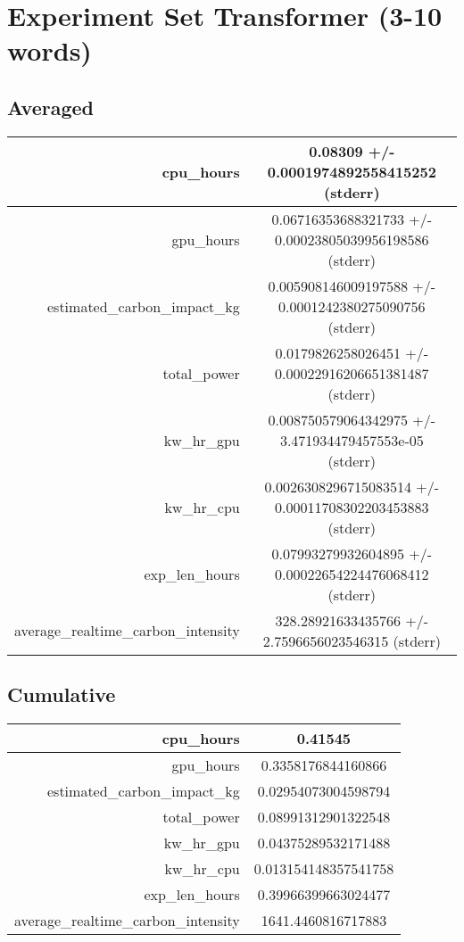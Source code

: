 \documentclass{article}%
\begin{document}
%
\normalsize%
\section{Experiment Set Transformer (3{-}10 words)}%
\label{sec:Experiment Set Transformer (3{-}10 words)}%
\subsection{Averaged}%
\label{subsec:Averaged}%
\begin{tabular}{|r|c|}%
\hline%
cpu\_hours&0.08309 +/{-} 0.0001974892558415252 (stderr)\\%
\hline%
gpu\_hours&0.06716353688321733 +/{-} 0.00023805039956198586 (stderr)\\%
\hline%
estimated\_carbon\_impact\_kg&0.005908146009197588 +/{-} 0.0001242380275090756 (stderr)\\%
\hline%
total\_power&0.0179826258026451 +/{-} 0.00022916206651381487 (stderr)\\%
\hline%
kw\_hr\_gpu&0.008750579064342975 +/{-} 3.471934479457553e{-}05 (stderr)\\%
\hline%
kw\_hr\_cpu&0.0026308296715083514 +/{-} 0.00011708302203453883 (stderr)\\%
\hline%
exp\_len\_hours&0.07993279932604895 +/{-} 0.00022654224476068412 (stderr)\\%
\hline%
average\_realtime\_carbon\_intensity&328.28921633435766 +/{-} 2.7596656023546315 (stderr)\\%
\hline%
\end{tabular}

%
\subsection{Cumulative}%
\label{subsec:Cumulative}%
\begin{tabular}{|r|c|}%
\hline%
cpu\_hours&0.41545\\%
\hline%
gpu\_hours&0.3358176844160866\\%
\hline%
estimated\_carbon\_impact\_kg&0.02954073004598794\\%
\hline%
total\_power&0.08991312901322548\\%
\hline%
kw\_hr\_gpu&0.04375289532171488\\%
\hline%
kw\_hr\_cpu&0.013154148357541758\\%
\hline%
exp\_len\_hours&0.39966399663024477\\%
\hline%
average\_realtime\_carbon\_intensity&1641.4460816717883\\%
\hline%
\end{tabular}

%
\end{document}
